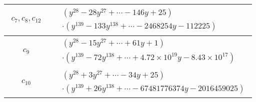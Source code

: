 \documentclass[1p]{elsarticle_modified}
\theoremstyle{definition}
\begin{document}
\begin{tabular}{m{50pt}|m{274pt}}
\hline $$\begin{aligned}c_{7},c_{8},c_{12}\end{aligned}$$&$\begin{aligned}
&(y^{28}-28 y^{27}+\cdots-146 y+25)\\
&\cdot(y^{139}-133 y^{138}+\cdots-2468254 y-112225)
\end{aligned}$\\
\hline $$\begin{aligned}c_{9}\end{aligned}$$&$\begin{aligned}
&(y^{28}-15 y^{27}+\cdots+61 y+1)\\
&\cdot(y^{139}-72 y^{138}+\cdots+4.72\times10^{19} y-8.43\times10^{17})
\end{aligned}$\\
\hline $$\begin{aligned}c_{10}\end{aligned}$$&$\begin{aligned}
&(y^{28}+3 y^{27}+\cdots-34 y+25)\\
&\cdot(y^{139}+26 y^{138}+\cdots-67481776374 y-2016459025)
\end{aligned}$\\
\hline
\end{tabular}
\vskip 2pc
\end{document}
